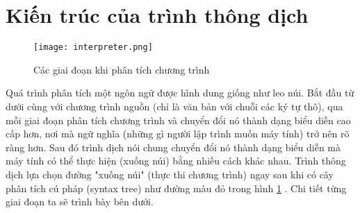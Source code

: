 \section{Kiến trúc của trình thông dịch}
\begin{figure}[H]
    \texttt{[image: interpreter.png]}   
    \centering
    \caption{Các giai đoạn khi phân tích chương trình} 
    \label{fig:stages}
\end{figure}

Quá trình phân tích một ngôn ngữ được hình dung giống như leo núi. Bắt đầu từ dưới cùng với chương trình nguồn (chỉ là văn bản với chuỗi các ký tự thô), qua mỗi giai đoạn phân tích chương trình và chuyển đổi nó thành dạng biểu diễn cao cấp hơn, nơi mà ngữ nghĩa (những gì người lập trình muốn máy tính) trở nên rõ ràng hơn. Sau đó trình dịch nói chung chuyển đổi nó thành dạng biểu diễn mà máy tính có thể thực hiện (xuống núi) bằng nhiều cách khác nhau. Trình thông dịch lựa chọn đường "xuống núi" (thực thi chương trình) ngay sau khi có cây phân tích cú pháp (syntax tree) như đường màu đỏ trong hình \ref{fig:stages} \cite{craftinginterpreters}. Chi tiết từng giai đoạn ta sẽ trình bày bên dưới.





